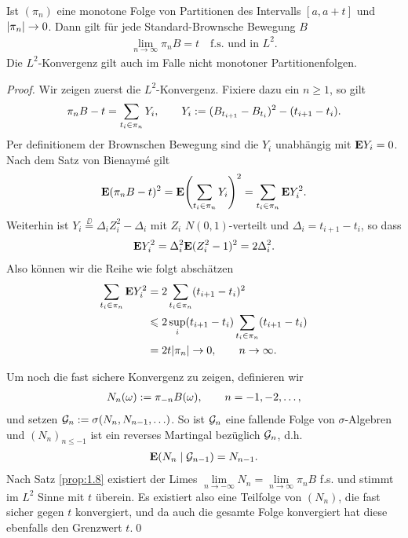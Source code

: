 \begin{prop}
\label{prop:1.26}
Ist $(\pi_n)$ eine monotone Folge von Partitionen des Intervalls $[a,a+t]$
und $\lvert\pi_n\rvert \to 0$. Dann gilt für jede Standard-Brownsche Bewegung $B$
\begin{align*}
\lim_{n\to\infty} \pi_n B =t \quad \text{f.s.\ und in $L^2$}.
\end{align*}
Die $L^2$-Konvergenz gilt auch im Falle nicht monotoner Partitionenfolgen.\fish
\end{prop}
\begin{proof}
Wir zeigen zuerst die $L^2$-Konvergenz. Fixiere dazu ein $n\ge 1$, so gilt
\begin{align*}
\pi_n B - t = \sum_{t_i\in \pi_n} Y_i,\qquad Y_i
:= (B_{t_{i+1}}-B_{t_i})^2 - (t_{i+1}-t_i).
\end{align*}
Per definitionem der Brownschen Bewegung sind die $Y_i$ unabhängig mit $\mathbf{E} Y_i =
0$. Nach dem Satz von Bienaymé gilt
\begin{align*}
\mathbf{E} (\pi_n B - t)^2 = \mathbf{E} \Biggl(\sum_{t_i\in \pi_n} Y_i\Biggr)^2 = 
\sum_{t_i \in \pi_n} \mathbf{E}  Y_i^2.
\end{align*}
Weiterhin ist $Y_i\overset{\DD}{=} \Delta_i Z_i^2  - \Delta_i$ 
mit $Z_i$ $N(0,1)$-verteilt und $\Delta_i = t_{i+1}-t_i$, so dass
\begin{align*}
\mathbf{E} Y_i^2 = \Delta_i^2 \mathbf{E} (Z_i^2 - 1)^2 = 2\Delta_i^2. 
\end{align*}
Also können wir die Reihe wie folgt abschätzen
\begin{align*}
\sum_{t_i \in \pi_n} \mathbf{E}  Y_i^2 &=
2 \sum_{t_i \in \pi_n} (t_{i+1}-t_i)^2 \\ &\leqslant 2\sup_{i} (t_{i+1}-t_i)
\sum_{t_i\in \pi_n} (t_{i+1}-t_i) \\ 
&= 2t \lvert\pi_n\rvert \to 0,\qquad n\to \infty.
\end{align*}

Um noch die fast sichere Konvergenz zu zeigen, definieren wir
\begin{align*}
N_{n}(\omega) := \pi_{-n} B(\omega),\qquad n = -1,-2,\ldots,
\end{align*}
und setzen $\mathcal{G}_n := \sigma(N_n,N_{n-1},\ldots)$. So ist $\mathcal{G}_n$ eine
fallende Folge von $\sigma$-Algebren und $(N_n)_{n\le -1}$ ist ein reverses
Martingal bezüglich $\mathcal{G}_n$, d.h.
\begin{align*}
\mathbf{E}(N_n\mid\mathcal{G}_{n-1}) = N_{n-1}.
\end{align*}
Nach Satz \ref{prop:1.8} existiert der Limes $\lim\limits_{n\to -\infty} N_n =
\lim\limits_{n\to \infty}\pi_n B$ f.s. und stimmt im $L^2$ Sinne mit $t$
überein. Es existiert also eine Teilfolge von $(N_n)$, die fast sicher gegen $t$
konvergiert, und da auch die gesamte Folge konvergiert hat diese ebenfalls den
Grenzwert $t$.\qed
\end{proof}

